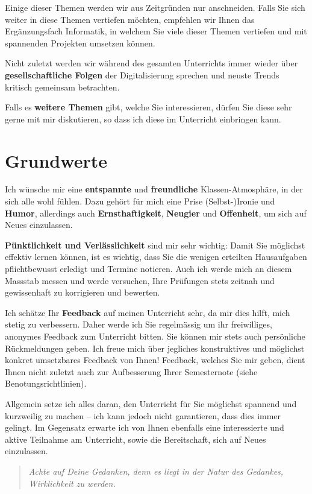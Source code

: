 Einige dieser Themen werden wir aus Zeitgründen nur anschneiden. Falls Sie sich weiter in diese Themen vertiefen möchten, empfehlen wir Ihnen das Ergänzungsfach Informatik, in welchem Sie viele dieser Themen vertiefen und mit spannenden Projekten umsetzen können.

Nicht zuletzt werden wir während des gesamten Unterrichts immer wieder über \textbf{gesellschaftliche Folgen} der Digitalisierung sprechen und neuste Trends kritisch gemeinsam betrachten.

Falls es \textbf{weitere Themen} gibt, welche Sie interessieren, dürfen Sie diese sehr gerne mit mir diskutieren, so dass ich diese im Unterricht einbringen kann.

\section*{Grundwerte}
Ich wünsche mir eine \textbf{entspannte} und \textbf{freundliche} Klassen-Atmosphäre, in der sich alle wohl fühlen. Dazu gehört für mich eine Prise (Selbst-)Ironie und \textbf{Humor}, allerdings auch \textbf{Ernsthaftigkeit}, \textbf{Neugier} und \textbf{Offenheit}, um sich auf Neues einzulassen.

\textbf{Pünktlichkeit und Verlässlichkeit} sind mir sehr wichtig: Damit Sie möglichst effektiv lernen können, ist es wichtig, dass Sie die wenigen erteilten Hausaufgaben pflichtbewusst erledigt und Termine notieren. Auch ich werde mich an diesem Massstab messen und werde versuchen, Ihre Prüfungen stets zeitnah und gewissenhaft zu korrigieren und bewerten.

Ich schätze Ihr \textbf{Feedback} auf meinen Unterricht sehr, da mir dies hilft, mich stetig zu verbessern. Daher werde ich Sie regelmässig um ihr freiwilliges, anonymes Feedback zum Unterricht bitten. Sie können mir stets auch persönliche Rückmeldungen geben. Ich freue mich über jegliches konstruktives und möglichst konkret umsetzbares Feedback von Ihnen! Feedback, welches Sie mir geben, dient Ihnen nicht zuletzt auch zur Aufbesserung Ihrer Semesternote (siehe Benotungsrichtlinien).

Allgemein setze ich alles daran, den Unterricht für Sie möglichst spannend und kurzweilig zu machen -- ich kann jedoch nicht garantieren, dass dies immer gelingt. Im Gegensatz erwarte ich von Ihnen ebenfalls eine interessierte und aktive Teilnahme am Unterricht, sowie die Bereitschaft, sich auf Neues einzulassen.

\begin{quote}
\textit{Achte auf Deine Gedanken, denn es liegt in der Natur des Gedankes, Wirklichkeit zu werden.}
\end{quote}

